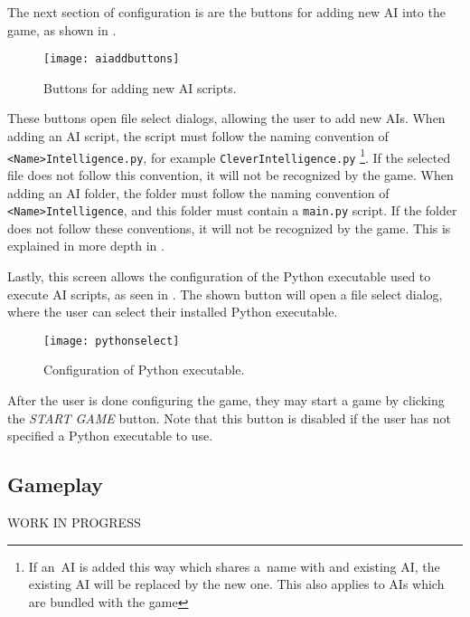The next section of configuration is are the buttons for adding new AI
into the game, as shown in .

\begin{figure}[ht]
\centerline{\mbox{\texttt{[image: aiaddbuttons]}}}
\caption{Buttons for adding new AI scripts.}\label{ud:aiaddbuttons}
\end{figure}

These buttons open file select dialogs, allowing the user to add new AIs.
When adding an AI script, the script must follow the naming convention
of \texttt{<Name>Intelligence.py}, for example \texttt{CleverIntelligence.py}
\footnote{If an~AI is added this way which shares a~name with and existing AI,
the existing AI will be replaced by the new one. This also applies to AIs which
are bundled with the game}.
If the selected file does not follow this convention, it will not be recognized
by the game.
When adding an AI folder, the folder must follow the naming convention of
\texttt{<Name>Intelligence}, and this folder must contain a \texttt{main.py}
script. If the folder does not follow these conventions, it will not be recognized
by the game. This is explained in more depth in .

Lastly, this screen allows the configuration of the Python executable used
to execute AI scripts, as seen in . The shown
button will open a file select dialog, where the user can select their
installed Python executable.

\begin{figure}[ht]
\centerline{\mbox{\texttt{[image: pythonselect]}}}
\caption{Configuration of Python executable.}\label{ud:pythonselect}
\end{figure}

After the user is done configuring the game, they may start a game by clicking the
\emph{START GAME} button. Note that this button is disabled if the user
has not specified a Python executable to use.

\subsection{Gameplay}

WORK IN PROGRESS
